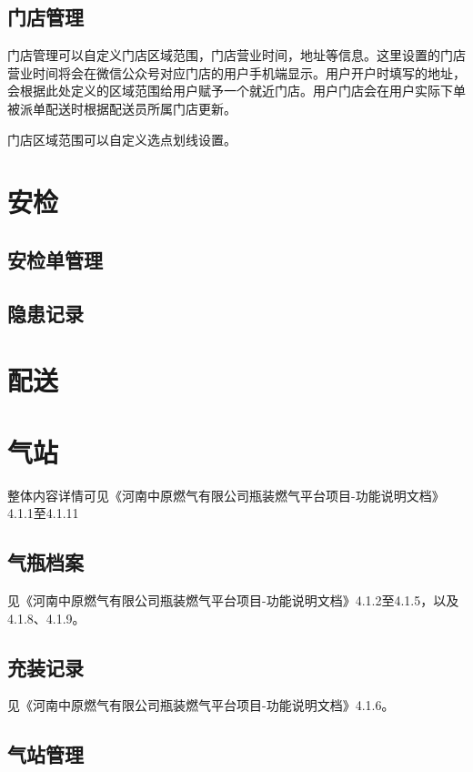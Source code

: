 \documentclass[UTF8]{ctexart}
\begin{document}
\subsection{门店管理}

门店管理可以自定义门店区域范围，门店营业时间，地址等信息。这里设置的门店营业时间将会在微信公众号对应门店的用户手机端显示。用户开户时填写的地址，会根据此处定义的区域范围给用户赋予一个就近门店。用户门店会在用户实际下单被派单配送时根据配送员所属门店更新。


门店区域范围可以自定义选点划线设置。



\section{安检}

\subsection{安检单管理}

\subsection{隐患记录}


\section{配送}


\section{气站}

整体内容详情可见《河南中原燃气有限公司瓶装燃气平台项目-功能说明文档》4.1.1至4.1.11

\subsection{气瓶档案}

见《河南中原燃气有限公司瓶装燃气平台项目-功能说明文档》4.1.2至4.1.5，以及4.1.8、4.1.9。

\subsection{充装记录}

见《河南中原燃气有限公司瓶装燃气平台项目-功能说明文档》4.1.6。

\subsection{气站管理}
\end{document}
